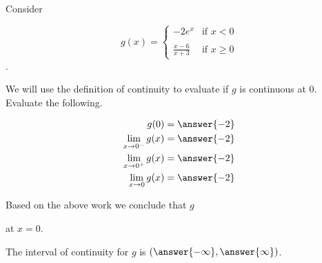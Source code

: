 \documentclass{ximera}
\author{Nela Lakos \and Kyle Parsons}
\begin{document}
\begin{exercise}

Consider

\[
g(x) = 
\begin{cases}
-2e^x & \text{if }x<0\\ \\
\frac{x-6}{x+3} & \text{if }x\geq0
\end{cases}
\].

We will use the definition of continuity to evaluate if $g$ is continuous at 0.  Evaluate the following.

\begin{align*}
g(0) &= \answer{-2}\\
\lim_{x\to0^-}g(x) &= \answer{-2}\\
\lim_{x\to0^+}g(x) &= \answer{-2}\\
\lim_{x\to0}g(x) &= \answer{-2}
\end{align*}

\begin{exercise}

Based on the above work we conclude that $g$
\begin{multipleChoice}
\end{multipleChoice}
at $x=0$.

\begin{exercise}

The interval of continuity for $g$ is $\left(\answer{-\infty},\answer{\infty}\right)$.

\end{exercise}
\end{exercise}
\end{exercise}
\end{document}
